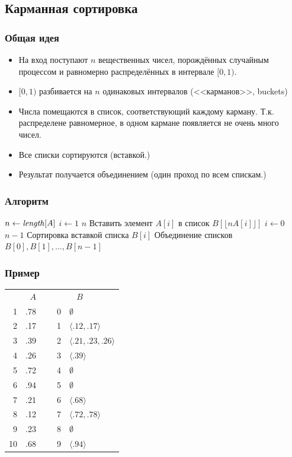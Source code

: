 \documentclass[hyperref={unicode=true}]{beamer}
\begin{document}
\subsection{Карманная сортировка}
\frame
{
  \frametitle{Общая идея}
  \begin{itemize}
    \item На вход поступают $n$ вещественных чисел, порождённых случайным процессом и
      равномерно распределённых в интервале $[0,1)$.
    \item $[0,1)$ разбивается на $n$ одинаковых интервалов
      (<<карманов>>, buckets)
    \item Числа помещаются в список, соответствующий каждому
      карману. Т.к. распределене равномерное, в одном кармане
      появляется не очень много чисел. 
    \item Все списки сортируются (вставкой.)
    \item Результат получается объединением (один проход по всем спискам.)
  \end{itemize}
}
\frame
{
  \frametitle{Алгоритм}
  \begin{codebox}
    \li $n \gets \id{length}[A]$
    \li \For $i \gets 1$ \To $n$
    \li  \Do Вставить элемент $A[i]$ в список 
    $B\left[\lfloor nA[i]\rfloor\right]$ \End
    \li \For $i \gets 0$ \To $n-1$
    \li   \Do Сортировка вставкой списка $B[i]$ \End
    \li Объединение списков $B[0], B[1], \ldots, B[n-1]$
  \end{codebox}


}
\frame
{
  \frametitle{Пример}
  \begin{center}
  \begin{tabular}{r|c|cr|l|}
    \multicolumn{2}{r}{$A$} & \multicolumn{3}{c}{$B$} \\
    \cline{2-2}\cline{5-5}
    1 & .78 & ~ & 0 & $\emptyset$\\
    \cline{2-2}\cline{5-5}
    2 & .17 & & 1 & $\langle .12, .17 \rangle$\\
    \cline{2-2}\cline{5-5}
    3 & .39 & & 2 & $\langle .21, .23, .26 \rangle $\\
    \cline{2-2}\cline{5-5}
    4 & .26 & & 3 & $\langle .39 \rangle$\\
    \cline{2-2}\cline{5-5}
    5 & .72 & & 4 & $\emptyset$\\
    \cline{2-2}\cline{5-5}
    6 & .94 & & 5 & $ \emptyset$\\
    \cline{2-2}\cline{5-5}
    7 & .21 & & 6& $\langle .68 \rangle$\\
    \cline{2-2}\cline{5-5}
    8 & .12 & & 7& $\langle .72, .78 \rangle$\\
    \cline{2-2}\cline{5-5}
    9 & .23 & & 8& $\emptyset $\\
    \cline{2-2}\cline{5-5}
    10 & .68 & & 9 & $\langle .94 \rangle$\\
    \cline{2-2}\cline{5-5}
  \end{tabular}
  \end{center}

}
\end{document}
